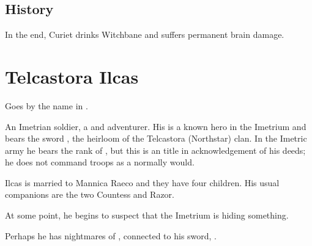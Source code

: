 \subsection{History}
In the end, {Curiet drinks Witchbane} and suffers permanent brain damage. 















\section{Telcastora Ilcas}
Goes by the name  in \Velcad{}. 

An Imetrian soldier, a \nycaneer{} and adventurer. His is a known hero in the Imetrium and bears the sword , the heirloom of the Telcastora (Northstar) clan. In the Imetric army he bears the rank of \Retaxis{}, but this is an \honorary title in acknowledgement of his deeds; he does not command troops as a \Retaxis{} normally would. 

Ilcas is married to Mannica Raeco and they have four children. His usual \travelling companions are the two \nycans{} Countess and Razor. 


At some point, he begins to suspect that the Imetrium is hiding something. 

Perhaps he has nightmares of , connected to his sword, .










